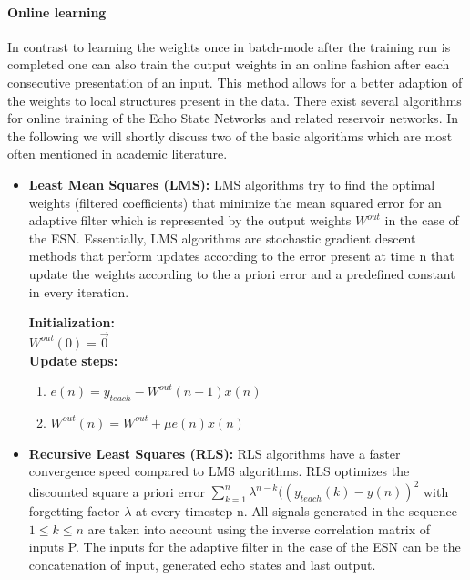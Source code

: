 \paragraph*{Online learning}
In contrast to learning the weights once in batch-mode after the training run is completed one can also train the output weights in an online fashion after each consecutive presentation of an input. This method allows for a better adaption of the weights to local structures present in the data. There exist several algorithms for online training of the Echo State Networks and related reservoir networks. In the following we will shortly discuss two of the basic algorithms which are most often mentioned in academic literature.
\begin{itemize}
\item \textbf{Least Mean Squares (LMS):} LMS algorithms try to find the optimal weights (filtered coefficients) that minimize the mean squared error for an adaptive filter which is represented by the output weights $W^{out}$ in the case of the ESN. Essentially, LMS algorithms are stochastic gradient descent methods that perform updates according to the error present at time n that update the weights according to the a priori error and a predefined constant in every iteration.\\
\indent
\begin{algorithm}[H]
\textbf{Initialization:}\\
$W^{out}(0) = \vec{0}$\\
\textbf{Update steps:}\\
\begin{enumerate}
\item $e(n) = y_{teach}-W^{out}(n-1)x(n)$
\item $W^{out}(n)=W^{out}+\mu e(n)x(n)$
\end{enumerate}
\end{algorithm}
\item \textbf{Recursive Least Squares (RLS):} RLS algorithms have a faster convergence speed compared to LMS algorithms. RLS optimizes the discounted square a priori error $\sum_{k=1}^{n} \lambda^{n-k}((y_{teach}(k) - y(n))^2$ with forgetting factor $\lambda$ at every timestep n. All signals generated in the sequence $1 \leq k \leq n$ are taken into account using the inverse correlation matrix of inputs P. The inputs for the adaptive filter in the case of the ESN can be the concatenation of input, generated echo states and last output.\\
\indent
\begin{algorithm}[H]

\end{algorithm}
\end{itemize}
